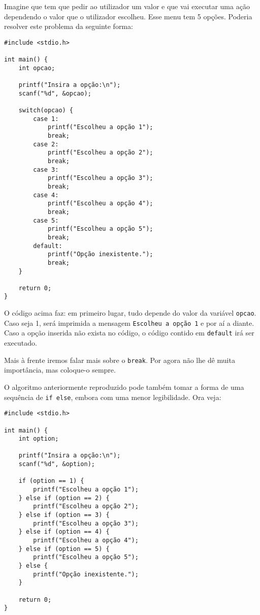 Imagine que tem que pedir ao utilizador um valor e que vai executar uma ação dependendo o valor que o utilizador escolheu. Esse menu tem 5 opções. Poderia resolver este problema da seguinte forma:

\begin{lstlisting}
#include <stdio.h>
 
int main() {
    int opcao;
 
    printf("Insira a opção:\n");
    scanf("%d", &opcao);
 
    switch(opcao) {
        case 1:
            printf("Escolheu a opção 1");
            break;
        case 2:
            printf("Escolheu a opção 2");
            break;
        case 3:
            printf("Escolheu a opção 3");
            break;
        case 4:
            printf("Escolheu a opção 4");
            break;
        case 5:
            printf("Escolheu a opção 5");
            break;
        default:
            printf("Opção inexistente.");
            break;        
    }
 
    return 0;
}
\end{lstlisting}

O código acima faz: em primeiro lugar, tudo depende do valor da variável \texttt{opcao}. Caso seja 1, será imprimida a mensagem \texttt{Escolheu a opção 1} e por aí a diante. Caso a opção inserida não exista no código, o código contido em \texttt{default} irá ser executado. 

Mais à frente iremos falar mais sobre o \texttt{break}. Por agora não lhe dê muita importância, mas coloque-o sempre.

O algoritmo anteriormente reproduzido pode também tomar a forma de uma sequência de \texttt{if else}, embora com uma menor legibilidade. Ora veja:

\begin{lstlisting}
#include <stdio.h>
 
int main() {
    int option;
 
    printf("Insira a opção:\n");
    scanf("%d", &option);
 
    if (option == 1) {
        printf("Escolheu a opção 1");
    } else if (option == 2) {
        printf("Escolheu a opção 2");
    } else if (option == 3) {
        printf("Escolheu a opção 3");
    } else if (option == 4) {
        printf("Escolheu a opção 4");
    } else if (option == 5) {
        printf("Escolheu a opção 5");
    } else {
        printf("Opção inexistente.");
    }
 
    return 0;
}
\end{lstlisting}

